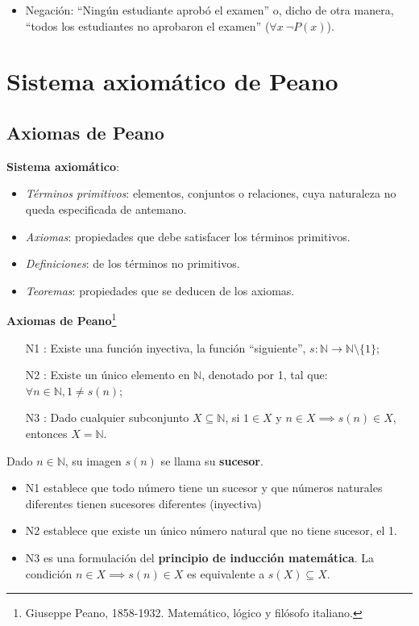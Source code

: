 \begin{enumerate}[label=\roman*)]
\begin{fmd-example}
\begin{itemize}
		\item Negación: ``Ningún estudiante aprobó el examen'' o, dicho de otra manera, ``todos los estudiantes no aprobaron el examen'' ($\forall x \ \neg P(x)$).
		\end{itemize}
	\end{fmd-example}
\end{enumerate}


\section{Sistema axiomático de Peano} 

\subsection{Axiomas de Peano}
\textbf{Sistema axiomático}:

\begin{itemize}
	\item \textit{Términos primitivos}: elementos, conjuntos o relaciones, cuya naturaleza no queda especificada de antemano.
	\item \textit{Axiomas}: propiedades que debe satisfacer los términos primitivos.
	\item \textit{Definiciones}: de los términos no primitivos.
	\item \textit{Teoremas}: propiedades que se deducen de los axiomas.
\end{itemize}

\textbf{Axiomas de Peano}\footnote{Giuseppe Peano, 1858-1932. Matemático, lógico y filósofo italiano.} \label{sec:peano} 
\begin{itemize}
	\item[N1]: Existe una función inyectiva, la función ``siguiente'', $s: \mathbb{N} \rightarrow \mathbb{N} \setminus \{1\}$;
	\item[N2]: Existe un único elemento en $\mathbb{N}$, denotado por 1, tal que: $\forall n \in \mathbb{N}, 1 \ne s(n)$;
	\item[N3]: Dado cualquier subconjunto $X \subseteq \mathbb{N}$, si $1 \in X$ y $n \in X \implies s(n) \in X$, entonces $X = \mathbb{N}$.
\end{itemize}
Dado $n \in \mathbb{N}$, su imagen $s(n)$ se llama su \textbf{sucesor}.
\begin{itemize}
	\item N1 establece que todo número tiene un sucesor y que números naturales diferentes tienen sucesores diferentes (inyectiva)
	\item N2 establece que existe un único número natural que no tiene sucesor, el 1.
	\item N3 es una formulación del \textbf{principio de inducción matemática}. La condición $n \in X \implies s(n) \in X$ es equivalente a $s(X) \subseteq X$.
\end{itemize}

